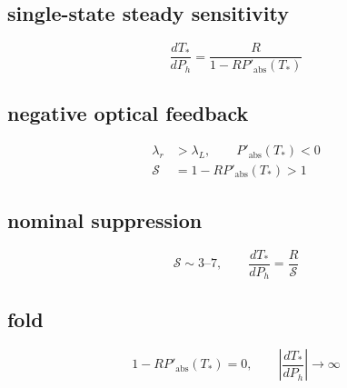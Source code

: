 \subsection*{single-state steady sensitivity}
\[
\displaystyle \frac{dT_*}{dP_h}=\frac R{1-RP'_{\mathrm{abs}}(T_*)}
\]

\subsection*{negative optical feedback}
\[
\displaystyle \begin{aligned}\lambda_r&>\lambda_L,\qquad P'_{\mathrm{abs}}(T_*)<0\\\mathcal S&=1-RP'_{\mathrm{abs}}(T_*)>1\end{aligned}
\]

\subsection*{nominal suppression}
\[
\displaystyle \mathcal S\sim3\text{--}7,\qquad\frac{dT_*}{dP_h}=\frac R{\mathcal S}
\]

\subsection*{fold}
\[
\displaystyle 1-RP'_{\mathrm{abs}}(T_*)=0,\qquad\left|\frac{dT_*}{dP_h}\right|\to\infty
\]
